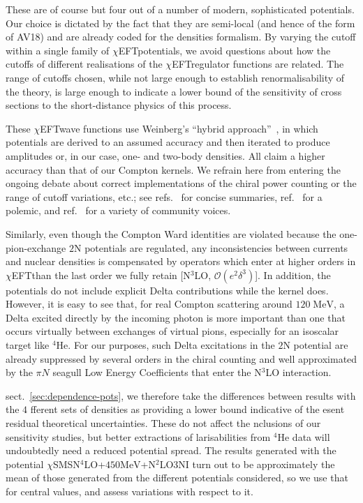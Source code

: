 \documentclass[12pt]{article}
\newcommand{\ChiEFT}{$\chi$EFT\;}
\newcommand{\fourHe}{${}^{4} \mathrm{He}$\xspace}
\newcommand{\MeV}{\mathrm{MeV}}
\newcommand{\3}{\ss}
\newcommand{\NXLO}[1]{N\ensuremath{{}^{#1}}LO\xspace}
\newcommand{\N}{\mathrm{N}}
\newcommand{\calO}{\mathcal{O}} \newcommand{\calP}{\mathcal{P}}
\newcommand{\chiSMSfourfive}{$\chi$SMSN$^4$LO+$450\MeV$+N$^2$LO3NI\xspace}
\numberwithin{equation}{section}
\begin{document}
These are of course but four out of a number of modern,
sophisticated potentials. Our choice is dictated by the fact that they are
semi-local (and hence of the form of AV18) and are already coded for the densities formalism. By varying the cutoff within a single family of \ChiEFT potentials, we avoid questions about how the cutoffs of different realisations of the \ChiEFT regulator functions are related. The range of cutoffs chosen, while not large enough to establish renormalisability of the theory, is large enough to indicate a lower bound of the sensitivity of cross sections to the short-distance physics of this process. 

These \ChiEFT wave functions use Weinberg's ``hybrid
approach''~\cite{Weinberg:1990rz}, in which potentials are derived to an assumed
accuracy and then iterated to produce amplitudes or, in our case, one- and
two-body densities. All claim a higher accuracy than that of our Compton
kernels. We refrain here from entering the ongoing debate about correct implementations
of the chiral power counting or the range of cutoff variations, etc.; see
refs.~\cite{Phillips:2013fia, vanKolck:2020llt} for concise summaries, ref.~\cite{Griesshammer:2021zzz} for a polemic, and ref.~\cite{Tews:2022yfb} for a variety of community voices.

Similarly, even though the Compton Ward identities are violated because the
one-pion-exchange $2\N$ potentials are regulated, any inconsistencies between
currents and nuclear densities is compensated by operators which enter at
higher orders in \ChiEFT than the last order we fully retain [\NXLO{3},
$\calO(e^2\delta^3)$]. In addition, the potentials do not include explicit
Delta contributions while the kernel does.  However, it is easy to see that,
for real Compton scattering around $120\;\MeV$, a Delta excited directly by
the incoming photon is more important than one that occurs virtually between
exchanges of virtual pions, especially for an isoscalar target like
\fourHe. For our purposes, such Delta excitations in the $2\N$ potential are
already suppressed by several orders in the chiral counting and well
approximated by the $\pi N$ seagull Low Energy Coefficients that enter the \NXLO{3} interaction.

 sect.~\ref{sec:dependence-pots}, we therefore take the differences between results with the $4$ 
fferent sets of densities as providing a lower bound indicative of the
esent residual theoretical uncertainties. These do not affect the
nclusions of our sensitivity studies, but better extractions of
larisabilities from \fourHe data will undoubtedly need a reduced potential
spread. 
The results generated with the potential \chiSMSfourfive turn out to be approximately the mean of those generated from the different potentials considered, so we use that for central values, and assess variations with respect to it. 
\end{document}
